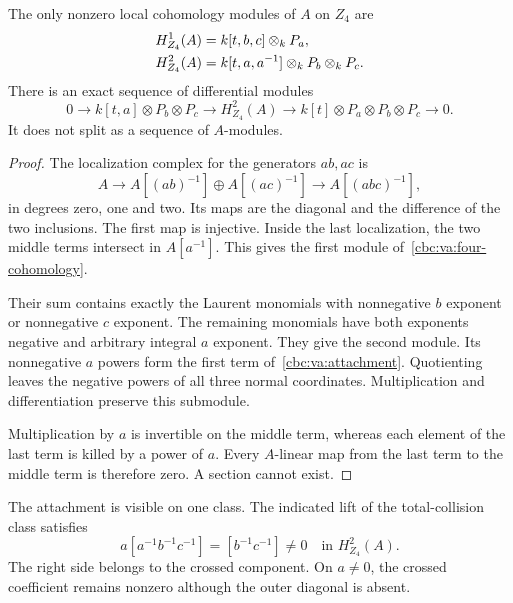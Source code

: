 \begin{proposition}\label{cbc:va:vacuum-extension}
The only nonzero local cohomology modules of $A$ on $Z_4$ are
\begin{align}
 H^1_{Z_4}(A)&=k[t,b,c]\otimes_kP_a,\notag\\
 H^2_{Z_4}(A)&=k[t,a,a^{-1}]\otimes_kP_b\otimes_kP_c.
 \label{cbc:va:four-cohomology}
\end{align}
There is an exact sequence of differential modules
\begin{equation}\label{cbc:va:attachment}
 0\longrightarrow k[t,a]\otimes P_b\otimes P_c
 \longrightarrow H^2_{Z_4}(A)
 \longrightarrow k[t]\otimes P_a\otimes P_b\otimes P_c
 \longrightarrow0.
\end{equation}
It does not split as a sequence of $A$-modules.
\end{proposition}
\begin{proof}
The localization complex for the generators $ab,ac$ is
\[
 A\longrightarrow A[(ab)^{-1}]\oplus A[(ac)^{-1}]
 \longrightarrow A[(abc)^{-1}],
\]
in degrees zero, one and two. Its maps are the diagonal
and the difference of the two inclusions. The first map
is injective. Inside the last localization, the two middle
terms intersect in $A[a^{-1}]$. This gives the first
module of~\eqref{cbc:va:four-cohomology}.

Their sum contains exactly the Laurent monomials with
nonnegative $b$ exponent or nonnegative $c$ exponent.
The remaining monomials have both exponents negative
and arbitrary integral $a$ exponent. They give the
second module. Its nonnegative $a$ powers form the first
term of~\eqref{cbc:va:attachment}. Quotienting leaves
the negative powers of all three normal coordinates.
Multiplication and differentiation preserve this submodule.

Multiplication by $a$ is invertible on the middle term,
whereas each element of the last term is killed by a
power of $a$. Every $A$-linear map from the last term
to the middle term is therefore zero. A section cannot exist.
\end{proof}

The attachment is visible on one class. The indicated
lift of the total-collision class satisfies
\begin{equation}\label{cbc:va:attaching-class}
 a[a^{-1}b^{-1}c^{-1}]=[b^{-1}c^{-1}]\ne0
 \quad\text{in }H^2_{Z_4}(A).
\end{equation}
The right side belongs to the crossed component.
On $a\ne0$, the crossed coefficient remains nonzero
although the outer diagonal is absent.

